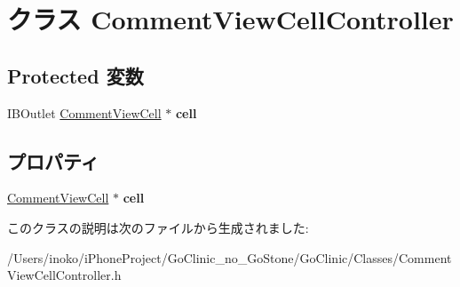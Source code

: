 \hypertarget{interface_comment_view_cell_controller}{
\section{クラス CommentViewCellController}
\label{interface_comment_view_cell_controller}
}
\subsection*{Protected 変数}
\begin{DoxyCompactItemize}
\item 
\hypertarget{interface_comment_view_cell_controller_ae0ac0956e5d70534a5725597e9b26d9e}{
IBOutlet \hyperlink{interface_comment_view_cell}{CommentViewCell} $\ast$ {\bfseries cell}}
\label{interface_comment_view_cell_controller_ae0ac0956e5d70534a5725597e9b26d9e}

\end{DoxyCompactItemize}
\subsection*{プロパティ}
\begin{DoxyCompactItemize}
\item 
\hypertarget{interface_comment_view_cell_controller_a951779506547b1ff03a16f911d7abf98}{
\hyperlink{interface_comment_view_cell}{CommentViewCell} $\ast$ {\bfseries cell}}
\label{interface_comment_view_cell_controller_a951779506547b1ff03a16f911d7abf98}

\end{DoxyCompactItemize}


このクラスの説明は次のファイルから生成されました:\begin{DoxyCompactItemize}
\item 
/Users/inoko/iPhoneProject/GoClinic\_\-no\_\-GoStone/GoClinic/Classes/CommentViewCellController.h\end{DoxyCompactItemize}
